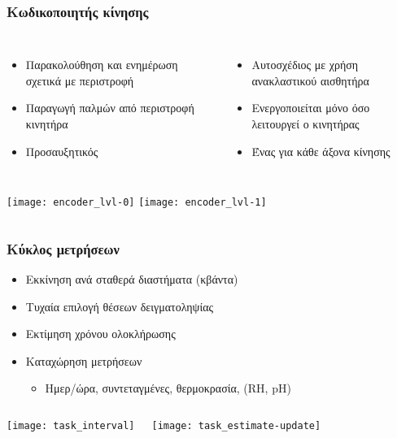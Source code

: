 \documentclass[xetex,mathserif,serif]{beamer}
\begin{document}
\begin{frame}\frametitle
    {Κωδικοποιητής κίνησης}

    \begin{columns}[t]
    \column{5.5cm}
    \begin{itemize}
        \item Παρακολούθηση και ενημέρωση σχετικά με περιστροφή
        \item Παραγωγή παλμών από περιστροφή κινητήρα
        \item Προσαυξητικός
    \end{itemize}

    \column{5.5cm}
    \begin{itemize}
        \item Αυτοσχέδιος με χρήση ανακλαστικού αισθητήρα
        \item Ενεργοποιείται μόνο όσο λειτουργεί ο κινητήρας
        \item Ένας για κάθε άξονα κίνησης
    \end{itemize}
    \end{columns}

    \begin{columns}
    \column{5cm}
    \texttt{[image: encoder\_lvl-0]}
    \column{5cm}
    \texttt{[image: encoder\_lvl-1]}
    \end{columns}
\end{frame}


\begin{frame}
    \frametitle{Κύκλος μετρήσεων}
    \begin{itemize}
    \item Εκκίνηση ανά σταθερά διαστήματα (κβάντα)
    \item Τυχαία επιλογή θέσεων δειγματοληψίας
    \item Εκτίμηση χρόνου ολοκλήρωσης
    \item Καταχώρηση μετρήσεων
        \begin{itemize}
            \item Ημερ\slash{}ώρα, συντεταγμένες, θερμοκρασία, (RH, pH)
        \end{itemize}
    \end{itemize}

    \rule{0pt}{0.5cm}
    \begin{columns}
    \column{5.5cm}
    \texttt{[image: task\_interval]}

    \column{5.5cm}
    \texttt{[image: task\_estimate-update]}
    \end{columns}
\end{frame}
\end{document}
